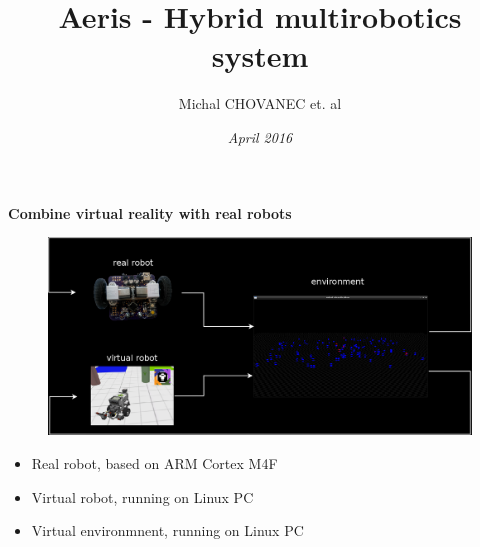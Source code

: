 \documentclass[xcolor=dvipsnames]{beamer}
\title{\bf Aeris - Hybrid multirobotics system}
\author{Michal CHOVANEC et. al }
\date[EURP]{\it April 2016}
\begin{document}
\begin{frame}
\titlepage
\end{frame}

\begin{frame}{\bf Combine virtual reality with real robots}

\begin{figure}[!htb]
\centering
\includegraphics[scale=.2]{../diagrams/aeris_idea_inv.png}
\end{figure}

\begin{itemize}
  \item Real robot, based on ARM Cortex M4F
  \item Virtual robot, running on Linux PC
  \item Virtual environmnent, running on Linux PC
\end{itemize}


\end{frame}
\end{document}
